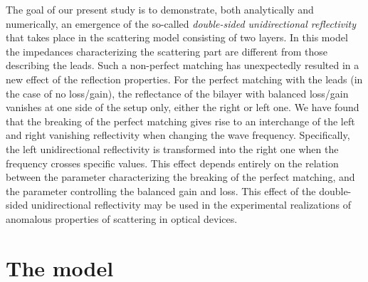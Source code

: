 \documentclass[aps,pra,reprint,showpacs,bibnotes,preprintnumbers,twoside,eqsecnum]{revtex4-1}
\begin{document}
The goal of our present study is to demonstrate, both analytically and numerically, an emergence of the so-called {\it double-sided unidirectional reflectivity} that takes place in the scattering model consisting of two layers. In this model the impedances characterizing the scattering part are different from those describing the leads. Such a non-perfect matching has unexpectedly resulted in a new effect of the reflection properties. For the perfect matching with the leads (in the case of no loss/gain), the reflectance of the bilayer with balanced loss/gain vanishes at one side of the setup only, either the right or left one. We have found that the breaking of the perfect matching gives rise to an interchange of the left and right vanishing reflectivity when changing the wave frequency. Specifically, the left unidirectional reflectivity is transformed into the right one when the frequency crosses specific values. This effect depends entirely on the relation between the parameter characterizing the breaking of the perfect matching, and the parameter controlling the balanced gain and loss. This effect of the double-sided unidirectional reflectivity may be used in the experimental realizations of anomalous properties of scattering in optical devices.

\section{The model}
\end{document}

